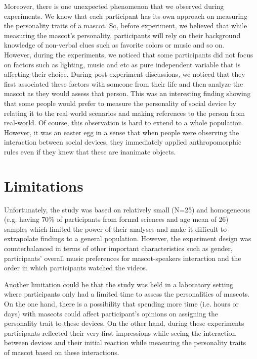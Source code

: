 \par Moreover, there is one unexpected phenomenon that we observed during experiments.
We know that each participant has its own approach on measuring the personality traits of a mascot.
So, before experiment, we believed that while measuring the mascot’s personality,
participants will rely on their background knowledge of non-verbal clues such as favorite colors or music and so on.
However, during the experiments, we noticed that some participants did not focus on
factors such as lighting, music and etc as pure independent variable that is affecting their choice.
During post-experiment discussions, we noticed that they first associated these factors with
someone from their life and then analyze the mascot as they would assess that person.
This was an interesting finding showing that some people would prefer to measure the
personality of social device by relating it to the real world scenarios and making
references to the person from real-world.
Of course, this observation is hard to extend to a whole population.
However, it was an easter egg in a sense that when people were observing the
interaction between social devices, they immediately applied anthropomorphic rules
even if they knew that these are inanimate objects.

\section{Limitations}
\label{sec:limitations}
Unfortunately, the study was based on relatively small (N=25) and homogeneous
(e.g. having 70\% of participants from formal sciences and age mean of 26) samples which
limited the power of their analyses and make it difficult to extrapolate findings to a general population.
However, the experiment design was counterbalanced in terms of other important
characteristics such as gender, participants’ overall music preferences for mascot-speakers
interaction and the order in which participants watched the videos.

\par Another limitation could be that the study was held in a laboratory setting where
participants only had a limited time to assess the personalities of mascots.
On the one hand, there is a possibility that spending more time (i.e. hours or days)
with mascots could affect participant’s opinions on assigning the personality trait to these devices.
On the other hand, during these experiments participants reflected their very first impressions
while seeing the interaction between devices and their initial reaction while measuring the
personality traits of mascot based on these interactions.

